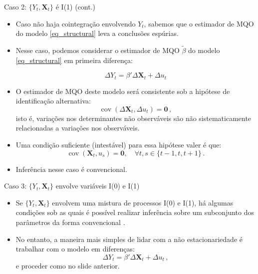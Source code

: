 \documentclass[11pt]{beamer}
\begin{document}
	
	\begin{frame}{Caso 2: $\{Y_t,\boldsymbol{X}_t\}$ é I(1) (cont.)}
		\begin{itemize}
			\item Caso não haja cointegração envolvendo $Y_t$, sabemos que o estimador de MQO do modelo \eqref{eq_structural} leva a conclusões espúrias.
			\item Nesse caso, podemos considerar o estimador de MQO $\tilde \beta$ do modelo \eqref{eq_structural} em primeira diferença:
			
			$$\Delta Y_t = \beta' \Delta \boldsymbol{X}_t + \Delta u_t$$
			\item O estimador de MQO deste modelo será consistente sob a hipótese de identificação alternativa:
			$$\operatorname{cov}( \Delta \boldsymbol{X}_t, \Delta {u}_t) = \boldsymbol{0}\, ,$$
			isto é, variações nos determinantes não observáveis são não sistematicamente relacionadas a variações nos observáveis.
			\item Uma condição suficiente (intestável) para essa hipótese valer é que:
			$$\operatorname{cov}(\boldsymbol{X}_t, {u}_{s})=\boldsymbol{0}, \quad  \forall t, s \in\{t-1,t,t+1\}\, .$$
			\item Inferência nesse caso é convencional.
		\end{itemize}
	\end{frame}
	
	\begin{frame}{Caso 3: $\{Y_t,\boldsymbol{X}_t\}$ envolve variáveis I(0) e I(1)}
		\begin{itemize}
			\item Se $\{Y_t,\boldsymbol{X}_t\}$ envolvem uma mistura de processos I(0) e I(1), há algumas condições sob as quais é possível realizar inferência sobre um subconjunto dos parâmetros da forma convencional \citep{Sims1990}.
			\item No entanto, a maneira mais simples de lidar com a não estacionariedade é trabalhar com o modelo em diferenças:
				$$\Delta Y_t = \beta' \Delta \boldsymbol{X}_t + \Delta u_t\, ,$$
				e proceder como no slide anterior.
		\end{itemize}
		\end{frame}
		
\end{document}
